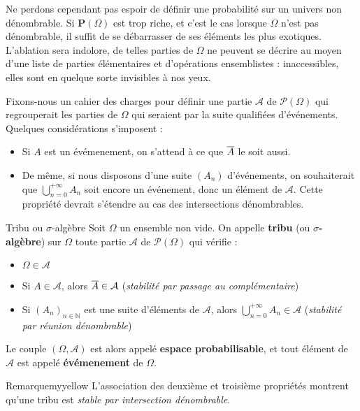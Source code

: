     Ne perdons cependant pas espoir de définir une probabilité sur un univers non dénombrable. Si $\mathbf{P}(\Omega)$ est trop riche, et c’est le cas lorsque $\Omega$ n’est pas dénombrable, il suffit de se débarrasser de ses éléments les plus exotiques. L’ablation sera indolore, de telles parties de $\Omega$ ne peuvent se décrire au moyen d’une liste de parties élémentaires et d’opérations ensemblistes : inaccessibles, elles sont en quelque sorte invisibles à nos yeux.

    Fixons-nous un cahier des charges pour définir une partie $\mathcal{A}$ de $\mathcal{P}(\Omega)$ qui regrouperait les parties de $\Omega$ qui seraient par la suite qualifiées d’événements. Quelques considérations s’imposent :
    \begin{itemize}
        \item Si $A$ est un évémenement, on s’attend à ce que $\overline{A}$ le soit aussi.
        \item De même, si nous disposons d’une suite $(A_n)$ d’événements, on souhaiterait que $\bigcup_{n=0}^{+\infty} A_n$ soit encore un événement, donc un élément de $\mathcal{A}$. Cette propriété devrait s’étendre au cas des intersections dénombrables.
    \end{itemize}

    \begin{defi}{Tribu ou $\sigma$-algèbre}
        Soit $\Omega$ un ensemble non vide. On appelle \textbf{tribu} (ou \textbf{$\sigma$-algèbre}) sur $\Omega$ toute partie $\mathcal{A}$ de $\mathcal{P}(\Omega)$ qui vérifie :
        \begin{itemize}
            \item $\Omega \in \mathcal{A}$
            \item Si $A \in \mathcal{A}$, alors $\overline{A} \in \mathcal{A}$ (\textit{stabilité par passage au complémentaire})
            \item Si $(A_n)_{n \in \mathbb{N}}$ est une suite d’éléments de $\mathcal{A}$, alors $\bigcup_{n=0}^{+\infty} A_n \in \mathcal{A}$ (\textit{stabilité par réunion dénombrable})
        \end{itemize}
        Le couple $(\Omega, \mathcal{A})$ est alors appelé \textbf{espace probabilisable}, et tout élément de $\mathcal{A}$ est appelé \textbf{évémenement} de $\Omega$.
    \end{defi}

    \begin{omed}{Remarque}{myyellow}
        L’association des deuxième et troisième propriétés montrent qu’une tribu est \textit{stable par intersection dénombrable}.
    \end{omed}

